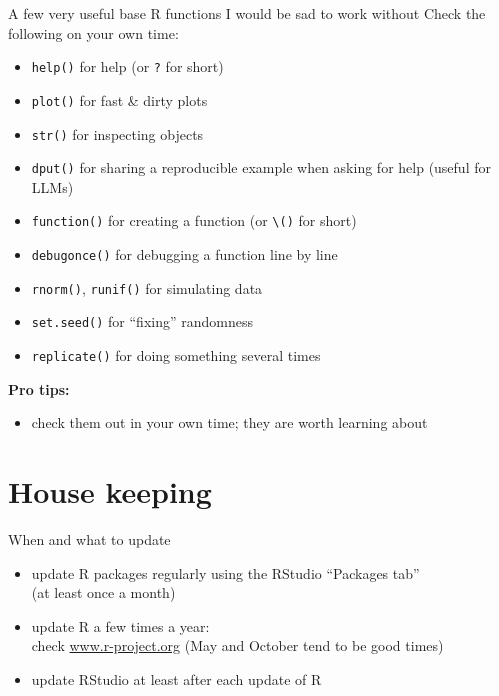 \documentclass[
  ignorenonframetext,
  aspectratio=169,
]{beamer}
\providecommand{\tightlist}{%
  \setlength{\itemsep}{0pt}\setlength{\parskip}{0pt}}
\let\oldtexttt\texttt
\renewcommand{\texttt}[1]{\colorbox{gray!20}{\oldtexttt{#1}}}
\begin{document}
\begin{frame}[fragile]{A few very useful base R functions I would be sad
to work without}
\protect{}\label{a-few-very-useful-base-r-functions-i-would-be-sad-to-work-without}
Check the following on your own time:

\begin{itemize}
\tightlist
\item
  \texttt{help()} for help (or \texttt{?} for short)
\item
  \texttt{plot()} for fast \& dirty plots
\item
  \texttt{str()} for inspecting objects
\item
  \texttt{dput()} for sharing a reproducible example when asking for
  help (useful for LLMs)
\item
  \texttt{function()} for creating a function (or
  \texttt{\textbackslash{}()} for short)
\item
  \texttt{debugonce()} for debugging a function line by line
\item
  \texttt{rnorm()}, \texttt{runif()} for simulating data
\item
  \texttt{set.seed()} for ``fixing'' randomness
\item
  \texttt{replicate()} for doing something several times
\end{itemize}

\textbf{Pro tips:}

\begin{itemize}
\tightlist
\item
  check them out in your own time; they are worth learning about
\end{itemize}
\end{frame}

\section{House keeping}\label{house-keeping}

\begin{frame}{When and what to update}
\protect{}\label{when-and-what-to-update}
\begin{itemize}
\tightlist
\item
  update R packages regularly using the RStudio ``Packages tab''\\
  (at least once a month)
\item
  update R a few times a year:\\
  check \href{https://www.r-project.org}{www.r-project.org} (May and
  October tend to be good times)
\item
  update RStudio at least after each update of R
\end{itemize}
\end{frame}
\end{document}
